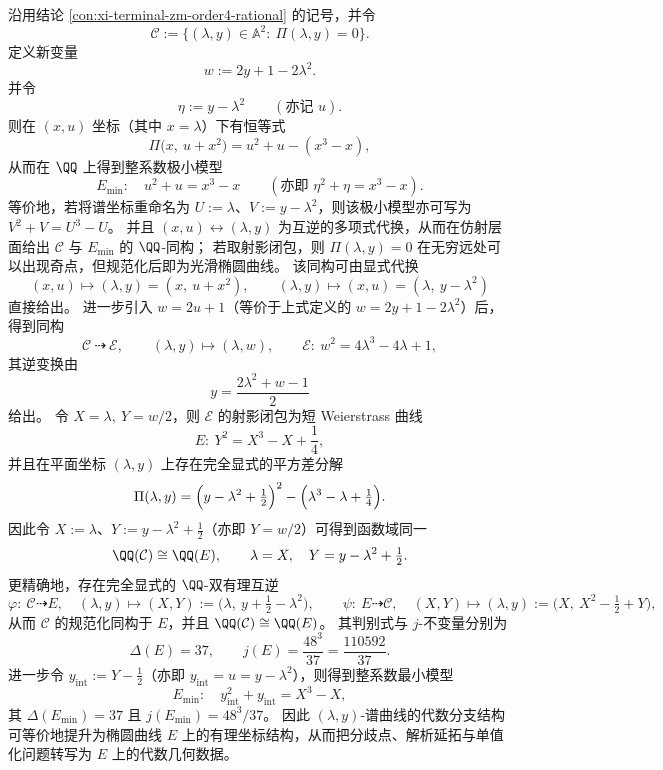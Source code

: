\begin{conclusion}\label{con:xi-terminal-zm-elliptic-normalization}
沿用结论 \ref{con:xi-terminal-zm-order4-rational} 的记号，并令
\[
\mathcal C:=\bigl\{(\lambda,y)\in\mathbb A^2:\ \Pi(\lambda,y)=0\bigr\}.
\]
定义新变量
\[
w:=2y+1-2\lambda^{2}.
\]
并令
\[
\eta:=y-\lambda^{2}\qquad(\text{亦记 }u).
\]
则在 \((x,u)\) 坐标（其中 \(x=\lambda\)）下有恒等式
\[
\Pi\bigl(x,\ u+x^{2}\bigr)=u^{2}+u-(x^{3}-x),
\]
从而在 \(\QQ\) 上得到整系数极小模型
\[
E_{\min}:\quad u^{2}+u=x^{3}-x\qquad(\text{亦即 }\eta^{2}+\eta=x^{3}-x).
\]
等价地，若将谱坐标重命名为 \(U:=\lambda\)、\(V:=y-\lambda^{2}\)，则该极小模型亦可写为 \(V^{2}+V=U^{3}-U\)。
并且 \((x,u)\leftrightarrow(\lambda,y)\) 为互逆的多项式代换，从而在仿射层面给出 \(\mathcal C\) 与 \(E_{\min}\) 的 \(\QQ\)-同构；
若取射影闭包，则 \(\Pi(\lambda,y)=0\) 在无穷远处可以出现奇点，但规范化后即为光滑椭圆曲线。
该同构可由显式代换
\[
(x,u)\longmapsto(\lambda,y)=(x,\ u+x^{2}),
\qquad
(\lambda,y)\longmapsto(x,u)=(\lambda,\ y-\lambda^{2})
\]
直接给出。
进一步引入 \(w=2u+1\)（等价于上式定义的 \(w=2y+1-2\lambda^{2}\)）后，得到同构
\[
\mathcal C\ \dashrightarrow\ \mathcal E,\qquad
(\lambda,y)\longmapsto(\lambda,w),
\qquad
\mathcal E:\ w^2=4\lambda^{3}-4\lambda+1,
\]
其逆变换由
\[
y=\frac{2\lambda^{2}+w-1}{2}
\]
给出。
令 \(X=\lambda,\ Y=w/2\)，则 \(\mathcal E\) 的射影闭包为短 Weierstrass 曲线
\[
E:\ Y^2=X^3-X+\frac14,
\]
并且在平面坐标 \((\lambda,y)\) 上存在完全显式的平方差分解
\[
\Pi(\lambda,y)=\Bigl(y-\lambda^2+\tfrac12\Bigr)^2-\Bigl(\lambda^3-\lambda+\tfrac14\Bigr).
\]
因此令 \(X:=\lambda\)、\(Y:=y-\lambda^2+\tfrac12\)（亦即 \(Y=w/2\)）可得到函数域同一
\[
\QQ(\mathcal C)\cong \QQ(E),\qquad \lambda=X,\quad Y=y-\lambda^2+\tfrac12.
\]
更精确地，存在完全显式的 \(\QQ\)-双有理互逆
\[
\varphi:\ \mathcal C\dashrightarrow E,\quad (\lambda,y)\longmapsto (X,Y):=\bigl(\lambda,\ y+\tfrac12-\lambda^2\bigr),
\qquad
\psi:\ E\dashrightarrow \mathcal C,\quad (X,Y)\longmapsto (\lambda,y):=\bigl(X,\ X^2-\tfrac12+Y\bigr),
\]
从而 \(\mathcal C\) 的规范化同构于 \(E\)，并且 \(\QQ(\mathcal C)\cong \QQ(E)\)。
其判别式与 \(j\)-不变量分别为
\[
\Delta(E)=37,\qquad j(E)=\frac{48^{3}}{37}=\frac{110592}{37}.
\]
进一步令 \(y_{\mathrm{int}}:=Y-\tfrac12\)（亦即 \(y_{\mathrm{int}}=u=y-\lambda^{2}\)），则得到整系数最小模型
\[
E_{\min}:\quad y_{\mathrm{int}}^{2}+y_{\mathrm{int}}=X^{3}-X,
\]
其 \(\Delta(E_{\min})=37\) 且 \(j(E_{\min})=48^{3}/37\)。
因此 \((\lambda,y)\)-谱曲线的代数分支结构可等价地提升为椭圆曲线 \(E\) 上的有理坐标结构，从而把分歧点、解析延拓与单值化问题转写为 \(E\) 上的代数几何数据。

\end{conclusion}
